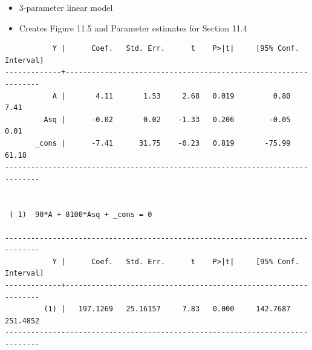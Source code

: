 \documentclass[
  10pt,
]{book}
\newenvironment{Shaded}{\begin{snugshade}}{\end{snugshade}}
\newcommand{\BaseNTok}[1]{\textcolor[rgb]{0.00,0.00,0.81}{#1}}
\newcommand{\DataTypeTok}[1]{\textcolor[rgb]{0.13,0.29,0.53}{#1}}
\newcommand{\KeywordTok}[1]{\textcolor[rgb]{0.13,0.29,0.53}{\textbf{#1}}}
\newcommand{\NormalTok}[1]{#1}
\newcommand{\OtherTok}[1]{\textcolor[rgb]{0.56,0.35,0.01}{#1}}
\providecommand{\tightlist}{%
  \setlength{\itemsep}{0pt}\setlength{\parskip}{0pt}}
\begin{document}
\begin{itemize}
\tightlist
\item
  3-parameter linear model
\item
  Creates Figure 11.5 and Parameter estimates for Section 11.4
\end{itemize}

\begin{Shaded}
\end{Shaded}

\begin{verbatim}
           Y |      Coef.   Std. Err.      t    P>|t|     [95% Conf. Interval]
-------------+----------------------------------------------------------------
           A |       4.11       1.53     2.68   0.019         0.80        7.41
         Asq |      -0.02       0.02    -1.33   0.206        -0.05        0.01
       _cons |      -7.41      31.75    -0.23   0.819       -75.99       61.18
------------------------------------------------------------------------------


 ( 1)  90*A + 8100*Asq + _cons = 0

------------------------------------------------------------------------------
           Y |      Coef.   Std. Err.      t    P>|t|     [95% Conf. Interval]
-------------+----------------------------------------------------------------
         (1) |   197.1269   25.16157     7.83   0.000     142.7687    251.4852
------------------------------------------------------------------------------
\end{verbatim}
\end{document}
